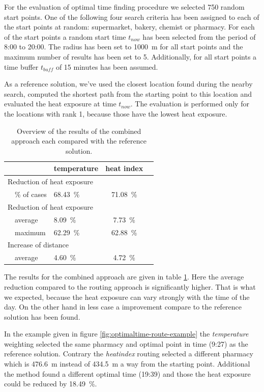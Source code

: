For the evaluation of optimal time finding procedure we selected 750 random start points. One of the following four search criteria has been assigned to each of the start points at random: supermarket, bakery, chemist or pharmacy. For each of the start points a random start time $t_{now}$ has been selected from the period of 8:00 to 20:00. The radius has been set to \SI{1000}{\meter} for all start points and the maximum number of results has been set to 5. Additionally, for all start points a time buffer $t_{buff}$ of 15 minutes has been assumed. 

As a reference solution, we've used the closest location found during the nearby search, computed the shortest path from the starting point to this location and evaluated the heat exposure at time $t_{now}$. The evaluation is performed only for the locations with rank 1, because those have the lowest heat exposure.

\begin{table}
	\centering
	\begin{tabular}{lp{8cm}lcc}
		\hline
		& & temperature & heat index \\
		\hline
		\multicolumn{4}{l}{Reduction of heat exposure}   \\
		& \% of cases  & \SI{68.43}{\percent} & \SI{71.08}{\percent}  \\
		\multicolumn{4}{l}{Reduction of heat exposure}  \\
		& average  & \SI{8.09}{\percent} & \SI{7.73}{\percent}  \\
		& maximum  & \SI{62.29}{\percent} & \SI{62.88}{\percent}  \\
		\multicolumn{4}{l}{Increase of distance}  \\
		& average  & \SI{4.60}{\percent}  & \SI{4.72}{\percent}  \\
		\hline
	\end{tabular}
	\caption{Overview of the results of the combined approach each compared with the reference solution.  \label{tab:results-optimal-time}}
\end{table}


The results for the combined approach are given in table \ref{tab:results-optimal-time}. Here the average reduction compared to the routing approach is significantly higher. That is what we expected, because the heat exposure can vary strongly with the time of the day. On the other hand in less case a improvement compare to the reference solution has been found. 

In the example given in figure \ref{fig:optimaltime-route-example} the \emph{temperature} weighting selected the same pharmacy and optimal point in time (9:27) as the reference solution. Contrary the \emph{heatindex} routing selected a different pharmacy which is \SI{476.6}{\meter} instead of  \SI{434.5}{\meter} a way from the starting point. Additional the method found a different optimal time (19:39) and those the heat exposure could be reduced by \SI{18.49}{\percent}.  
 

